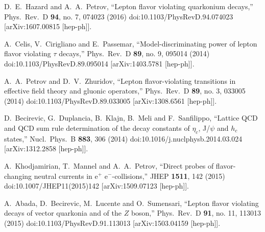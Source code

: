 \documentclass[12pt]{article}
\begin{document}
\begin{thebibliography}{99}


  D.~E.~Hazard and A.~A.~Petrov,
  ``Lepton flavor violating quarkonium decays,''
  Phys.\ Rev.\ D {\bf 94}, no. 7, 074023 (2016)
  doi:10.1103/PhysRevD.94.074023
  [arXiv:1607.00815 [hep-ph]].

  A.~Celis, V.~Cirigliano and E.~Passemar,
  ``Model-discriminating power of lepton flavor violating $\tau$ decays,''
  Phys.\ Rev.\ D {\bf 89}, no. 9, 095014 (2014)
  doi:10.1103/PhysRevD.89.095014
  [arXiv:1403.5781 [hep-ph]].

  A.~A.~Petrov and D.~V.~Zhuridov,
  ``Lepton flavor-violating transitions in effective field theory and gluonic operators,''
  Phys.\ Rev.\ D {\bf 89}, no. 3, 033005 (2014)
  doi:10.1103/PhysRevD.89.033005
  [arXiv:1308.6561 [hep-ph]].

  D.~Becirevic, G.~Duplancia, B.~Klajn, B.~Meli and F.~Sanfilippo,
  ``Lattice QCD and QCD sum rule determination of the decay constants of $\eta_c$, J/$\psi$ and $h_c$ states,''
  Nucl.\ Phys.\ B {\bf 883}, 306 (2014)
  doi:10.1016/j.nuclphysb.2014.03.024
  [arXiv:1312.2858 [hep-ph]].
  
  A.~Khodjamirian, T.~Mannel and A.~A.~Petrov,
  ``Direct probes of flavor-changing neutral currents in e$^{+}$ e$^{-}$-collisions,''
  JHEP {\bf 1511}, 142 (2015)
  doi:10.1007/JHEP11(2015)142
  [arXiv:1509.07123 [hep-ph]].
  
  A.~Abada, D.~Becirevic, M.~Lucente and O.~Sumensari,
  ``Lepton flavor violating decays of vector quarkonia and of the $Z$ boson,''
  Phys.\ Rev.\ D {\bf 91}, no. 11, 113013 (2015)
  doi:10.1103/PhysRevD.91.113013
  [arXiv:1503.04159 [hep-ph]].


\end{thebibliography}
\end{document}
